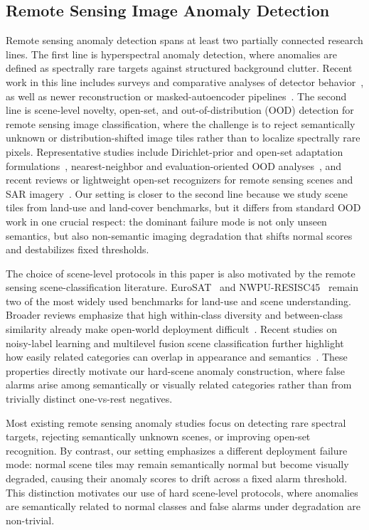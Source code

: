 \documentclass[remotesensing,article,submit,pdftex,moreauthors]{Definitions/mdpi}
\begin{document}
\subsection{Remote Sensing Image Anomaly Detection}
Remote sensing anomaly detection spans at least two partially connected research lines. The first line is hyperspectral anomaly detection, where anomalies are defined as spectrally rare targets against structured background clutter. Recent work in this line includes surveys and comparative analyses of detector behavior~\cite{hyperspectralsurvey,hsicomparison}, as well as newer reconstruction or masked-autoencoder pipelines~\cite{hsisscmae}. The second line is scene-level novelty, open-set, and out-of-distribution (OOD) detection for remote sensing image classification, where the challenge is to reject semantically unknown or distribution-shifted image tiles rather than to localize spectrally rare pixels. Representative studies include Dirichlet-prior and open-set adaptation formulations~\cite{rsdpnood,rsopenset}, nearest-neighbor and evaluation-oriented OOD analyses~\cite{rsnnood,rsoddeval}, and recent reviews or lightweight open-set recognizers for remote sensing scenes and SAR imagery~\cite{zsrssc,liosrsar}. Our setting is closer to the second line because we study scene tiles from land-use and land-cover benchmarks, but it differs from standard OOD work in one crucial respect: the dominant failure mode is not only unseen semantics, but also non-semantic imaging degradation that shifts normal scores and destabilizes fixed thresholds.

The choice of scene-level protocols in this paper is also motivated by the remote sensing scene-classification literature. EuroSAT~\cite{eurosat} and NWPU-RESISC45~\cite{resisc45} remain two of the most widely used benchmarks for land-use and scene understanding. Broader reviews emphasize that high within-class diversity and between-class similarity already make open-world deployment difficult~\cite{rsscenereview}. Recent studies on noisy-label learning and multilevel fusion scene classification further highlight how easily related categories can overlap in appearance and semantics~\cite{noisyrs,dualmodelscene}. These properties directly motivate our hard-scene anomaly construction, where false alarms arise among semantically or visually related categories rather than from trivially distinct one-vs-rest negatives.

Most existing remote sensing anomaly studies focus on detecting rare spectral targets, rejecting semantically unknown scenes, or improving open-set recognition. By contrast, our setting emphasizes a different deployment failure mode: normal scene tiles may remain semantically normal but become visually degraded, causing their anomaly scores to drift across a fixed alarm threshold. This distinction motivates our use of hard scene-level protocols, where anomalies are semantically related to normal classes and false alarms under degradation are non-trivial.
\end{document}
